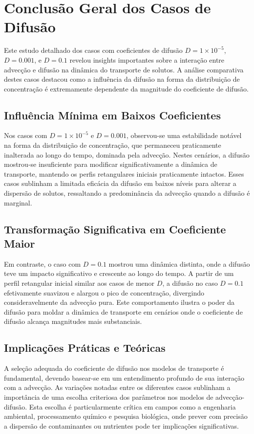 \section{Conclusão Geral dos Casos de Difusão}

Este estudo detalhado dos casos com coeficientes de difusão \(D = 1 \times 10^{-5}\), \(D = 0.001\), e \(D = 0.1\) revelou insights importantes sobre a interação entre advecção e difusão na dinâmica do transporte de solutos. A análise comparativa destes casos destacou como a influência da difusão na forma da distribuição de concentração é extremamente dependente da magnitude do coeficiente de difusão.

\subsection*{Influência Mínima em Baixos Coeficientes}
Nos casos com \(D = 1 \times 10^{-5}\) e \(D = 0.001\), observou-se uma estabilidade notável na forma da distribuição de concentração, que permaneceu praticamente inalterada ao longo do tempo, dominada pela advecção. Nestes cenários, a difusão mostrou-se insuficiente para modificar significativamente a dinâmica de transporte, mantendo os perfis retangulares iniciais praticamente intactos. Esses casos sublinham a limitada eficácia da difusão em baixos níveis para alterar a dispersão de solutos, ressaltando a predominância da advecção quando a difusão é marginal.

\subsection*{Transformação Significativa em Coeficiente Maior}
Em contraste, o caso com \(D = 0.1\) mostrou uma dinâmica distinta, onde a difusão teve um impacto significativo e crescente ao longo do tempo. A partir de um perfil retangular inicial similar aos casos de menor \(D\), a difusão no caso \(D = 0.1\) efetivamente suavizou e alargou o pico de concentração, divergindo consideravelmente da advecção pura. Este comportamento ilustra o poder da difusão para moldar a dinâmica de transporte em cenários onde o coeficiente de difusão alcança magnitudes mais substanciais.

\subsection*{Implicações Práticas e Teóricas}
A seleção adequada do coeficiente de difusão nos modelos de transporte é fundamental, devendo basear-se em um entendimento profundo de sua interação com a advecção. As variações notadas entre os diferentes casos sublinham a importância de uma escolha criteriosa dos parâmetros nos modelos de advecção-difusão. Esta escolha é particularmente crítica em campos como a engenharia ambiental, processamento químico e pesquisa biológica, onde prever com precisão a dispersão de contaminantes ou nutrientes pode ter implicações significativas.

